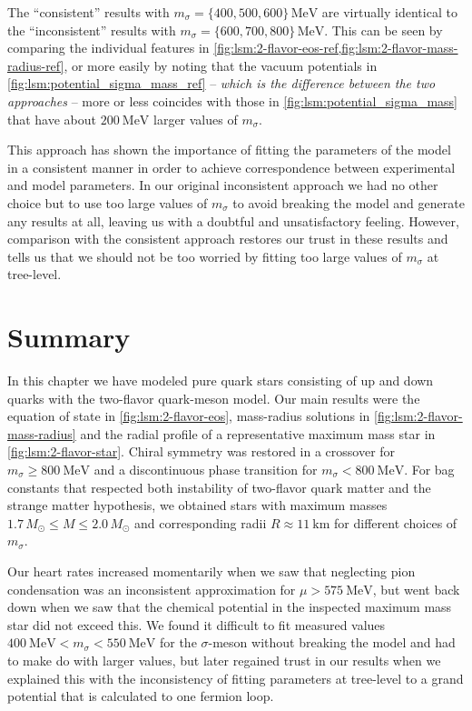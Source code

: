 The ``consistent'' results with $m_\sigma=\{400,500,600\} \, \si{\mega\electronvolt}$ are
virtually identical to the ``inconsistent'' results with $m_\sigma=\{600,700,800\} \, \si{\mega\electronvolt}$.
This can be seen by comparing the individual features in \cref{fig:lsm:2-flavor-eos-ref,fig:lsm:2-flavor-mass-radius-ref},
or more easily by noting that the vacuum potentials in \cref{fig:lsm:potential_sigma_mass_ref}
-- \emph{which is the difference between the two approaches} --
more or less coincides with those in \cref{fig:lsm:potential_sigma_mass} that have about $\SI{200}{\mega\electronvolt}$ larger values of $m_\sigma$.

This approach has shown the importance of fitting the parameters of the model in a consistent manner in order to achieve correspondence between experimental and model parameters.
In our original inconsistent approach we had no other choice but to use too large values of $m_\sigma$ to avoid breaking the model and generate any results at all,
leaving us with a doubtful and unsatisfactory feeling.
However, comparison with the consistent approach restores our trust in these results
and tells us that we should not be too worried by fitting too large values of $m_\sigma$ at tree-level.

\pagebreak
\section{Summary}

In this chapter we have modeled pure quark stars consisting of up and down quarks with the two-flavor quark-meson model.
Our main results were the equation of state in \cref{fig:lsm:2-flavor-eos}, mass-radius solutions in \cref{fig:lsm:2-flavor-mass-radius} and the radial profile of a representative maximum mass star in \cref{fig:lsm:2-flavor-star}.
Chiral symmetry was restored in a crossover for $m_\sigma \geq \SI{800}{\mega\electronvolt}$ and a discontinuous phase transition for $m_\sigma < \SI{800}{\mega\electronvolt}$.
For bag constants that respected both instability of two-flavor quark matter and the strange matter hypothesis,
we obtained stars with maximum masses $1.7 \, M_\odot \leq M \leq 2.0 \, M_\odot$ and corresponding radii $R \approx \SI{11}{\kilo\meter}$ for different choices of $m_\sigma$.

Our heart rates increased momentarily when we saw that neglecting pion condensation was an inconsistent approximation for $\mu > \SI{575}{\mega\electronvolt}$,
but went back down when we saw that the chemical potential in the inspected maximum mass star did not exceed this.
We found it difficult to fit measured values $\SI{400}{\mega\electronvolt} < m_\sigma < \SI{550}{\mega\electronvolt}$ for the $\sigma$-meson without breaking the model and had to make do with larger values,
but later regained trust in our results when we explained this with the inconsistency of fitting parameters at tree-level to a grand potential that is calculated to one fermion loop.

